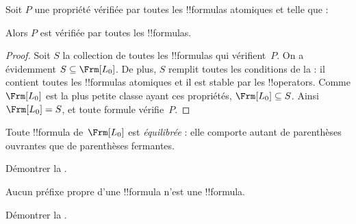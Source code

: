 \documentclass[../../../include/open-logic-section]{subfiles}
\begin{document}


\begin{thm}
  Soit $P$ une propriété vérifiée par toutes les !!{formula}s atomiques
  et telle que :
  \begin{enumerate}
  \end{enumerate}
  Alors $P$ est vérifiée par toutes les !!{formula}s.
\end{thm}

\begin{proof}
  Soit $S$ la collection de toutes les !!{formula}s qui vérifient~$P$.
  On a évidemment $S \subseteq \Frm[L_0]$. De plus, $S$ remplit toutes
  les conditions de la  : il contient toutes
  les !!{formula}s atomiques et il est stable par les !!{operator}s.
  Comme $\Frm[L_0]$ est la plus petite classe ayant ces propriétés,
  $\Frm[L_0] \subseteq S$. Ainsi $\Frm[L_0] = S$, et toute formule
  vérifie~$P$.
\end{proof}

\begin{prop}
   Toute !!{formula} de~$\Frm[L_0]$ est \emph{équilibrée} :
   elle comporte autant de parenthèses ouvrantes que de parenthèses
   fermantes.
\end{prop}

\begin{prob}
Démontrer la .
\end{prob}

\begin{prop}
Aucun préfixe propre d'une !!{formula} n'est une !!{formula}.
\end{prop}

\begin{prob}
  Démontrer la .
\end{prob}
\end{document}
